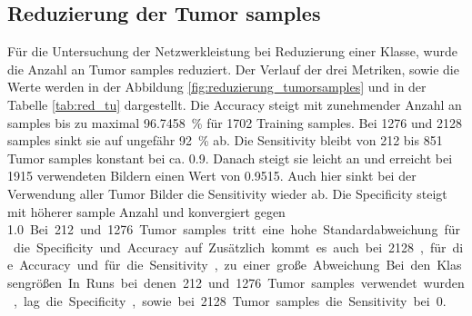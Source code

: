 \subsection{Reduzierung der Tumor samples}
Für die Untersuchung der Netzwerkleistung bei Reduzierung einer Klasse, wurde die Anzahl an Tumor samples reduziert.
Der Verlauf der drei Metriken, sowie die Werte werden in der Abbildung \ref{fig:reduzierung_tumorsamples} und in der Tabelle \ref{tab:red_tu} dargestellt.
Die Accuracy steigt mit zunehmender Anzahl an samples bis zu maximal \SI{96.7458}{\percent} für 1702 Training samples.
Bei 1276 und 2128 samples sinkt sie auf ungefähr \SI{92}{\percent} ab. 
Die Sensitivity bleibt von 212 bis 851 Tumor samples konstant bei ca. \SI{0.9}{}.
Danach steigt sie leicht an und erreicht bei 1915 verwendeten Bildern einen Wert von \SI{0.9515}{}.
Auch hier sinkt bei der Verwendung aller Tumor Bilder die Sensitivity wieder ab.
Die Specificity steigt mit höherer sample Anzahl und konvergiert gegen \SI{1.0}.
Bei 212 und 1276 Tumor samples tritt eine hohe Standardabweichung für die Specificity und Accuracy auf.
Zusätzlich kommt es auch bei 2128, für die Accuracy und für die Sensitivity, zu einer große Abweichung
Bei den Klassengrößen 
In Runs bei denen 212 und 1276 Tumor samples verwendet wurden, lag die Specificity, 
sowie bei 2128 Tumor samples die Sensitivity bei 0.


